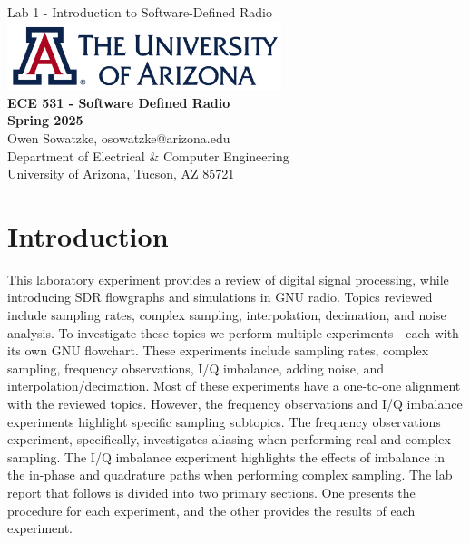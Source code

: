\documentclass{article}
\begin{document}
\begin{titlepage}
	\centering
	{\huge Lab 1 - Introduction to Software-Defined Radio}\\[0.25 in]
	\includegraphics[width=0.6\textwidth]{ua_logo.png}\\[0.25 in]
	{\large \textbf{ECE 531 - Software Defined Radio\\[0.25 in]
	Spring 2025\\[0.25 in]}}
	{\large Owen Sowatzke, osowatzke@arizona.edu\\[0.05 in]
	Department of Electrical \& Computer Engineering\\[0.05 in]
	University of Arizona, Tucson, AZ 85721\\[0.5 in]}
	\textcolor{blue}{
	\noindent\hrulefill
	\tableofcontents
	\noindent\hrulefill
	}
\end{titlepage}

\setlength{\parindent}{0pt}

\section{Introduction}

This laboratory experiment provides a review of digital signal processing, while introducing SDR flowgraphs and simulations in GNU radio. Topics reviewed include sampling rates, complex sampling, interpolation, decimation, and noise analysis. To investigate these topics we perform multiple experiments - each with its own GNU flowchart. These experiments include sampling rates, complex sampling, frequency observations, I/Q imbalance, adding noise, and interpolation/decimation. Most of these experiments have a one-to-one alignment with the reviewed topics. However, the frequency observations and I/Q imbalance experiments highlight specific sampling subtopics. The frequency observations experiment, specifically, investigates aliasing when performing real and complex sampling. The I/Q imbalance experiment highlights the effects of imbalance in the in-phase and quadrature paths when performing complex sampling. The lab report that follows is divided into two primary sections. One presents the procedure for each experiment, and the other provides the results of each experiment.
\end{document}
